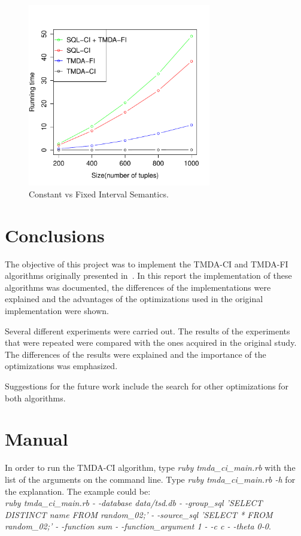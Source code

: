 \documentclass[a4paper,11pt]{article}
\begin{document}
\begin{figure}[ht!]
\centering 
\includegraphics[width=80mm]{../graphs/sql_tmda_fi.pdf}
\caption{Constant vs Fixed Interval Semantics.}
\label{sql_tmda_fi} 
\end{figure}

\section{Conclusions}

The objective of this project was to implement the TMDA-CI and TMDA-FI algorithms  originally presented in~\cite{bohlen}. In this report the implementation of these algorithms was documented, the differences of the implementations were explained and the advantages of the optimizations used in the original implementation were shown. 

Several different experiments were carried out. The results of the experiments that were repeated were compared with the ones acquired in the original study. The differences of the results were explained and the importance of the optimizations was emphasized.

Suggestions for the future work include the search for other optimizations for both algorithms.

\section{Manual}

In order to run the TMDA-CI algorithm, type \textit{ruby tmda\_ci\_main.rb} with the list of the arguments on the command line. Type \textit{ruby tmda\_ci\_main.rb -h} for the explanation. The example could be:\\ \textit{ruby tmda\_ci\_main.rb - -database data/tsd.db - -group\_sql 'SELECT DISTINCT name FROM random\_02;' - -source\_sql 'SELECT * FROM random\_02;' - -function sum - -function\_argument 1 - -c c - -theta 0-0}.
\end{document}

